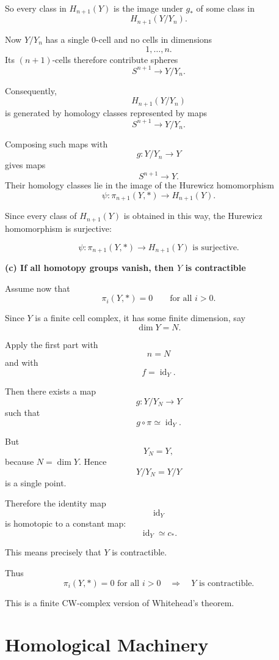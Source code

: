 \begin{solution}
So every class in \(H_{n+1}(Y)\) is the image under \(g_*\) of some class in
\[
H_{n+1}(Y/Y_n).
\]

Now \(Y/Y_n\) has a single \(0\)-cell and no cells in dimensions
\[
1,\ldots,n.
\]
Its \((n+1)\)-cells therefore contribute spheres
\[
S^{n+1}\to Y/Y_n.
\]

Consequently,
\[
H_{n+1}(Y/Y_n)
\]
is generated by homology classes represented by maps
\[
S^{n+1}\to Y/Y_n.
\]

Composing such maps with
\[
g:Y/Y_n\to Y
\]
gives maps
\[
S^{n+1}\to Y.
\]
Their homology classes lie in the image of the Hurewicz homomorphism
\[
\psi:\pi_{n+1}(Y,*)\to H_{n+1}(Y).
\]

Since every class of \(H_{n+1}(Y)\) is obtained in this way, the Hurewicz homomorphism is surjective:

\[
\boxed{
	\psi:\pi_{n+1}(Y,*)\to H_{n+1}(Y)
	\text{ is surjective.}
}
\]


\medskip
\noindent\textbf{(c) If all homotopy groups vanish, then \(Y\) is contractible}\par
\smallskip


Assume now that
\[
\pi_i(Y,*)=0
\qquad
\text{for all }i>0.
\]

Since \(Y\) is a finite cell complex, it has some finite dimension, say
\[
\dim Y=N.
\]

Apply the first part with
\[
n=N
\]
and with
\[
f=\operatorname{id}_Y.
\]

Then there exists a map
\[
g:Y/Y_N\to Y
\]
such that
\[
g\circ \pi\simeq \operatorname{id}_Y.
\]

But
\[
Y_N=Y,
\]
because \(N=\dim Y\). Hence
\[
Y/Y_N=Y/Y
\]
is a single point.

Therefore the identity map
\[
\operatorname{id}_Y
\]
is homotopic to a constant map:
\[
\operatorname{id}_Y\simeq c_*.
\]

This means precisely that \(Y\) is contractible.

Thus
\[
\boxed{
	\pi_i(Y,*)=0\text{ for all }i>0
	\quad\Longrightarrow\quad
	Y\text{ is contractible.}
}
\]

This is a finite CW-complex version of Whitehead's theorem.

\par
\end{solution}

\section{Homological Machinery}

